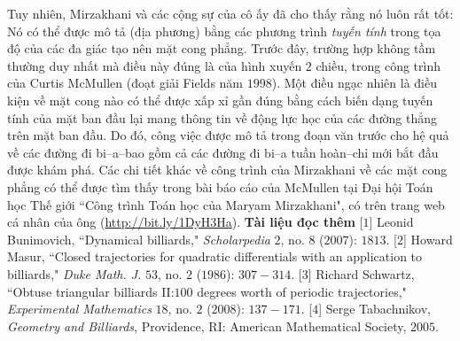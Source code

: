 \begin{multicols}{2}
	\vskip 0.1cm
	Tuy nhiên, Mirzakhani và các cộng sự của cô ấy đã cho thấy rằng nó luôn rất tốt: Nó có thể được mô tả (địa phương) bằng các phương trình \emph{tuyến tính} trong tọa độ của
	các đa giác tạo nên mặt cong phẳng. Trước đây, trường hợp không tầm thường duy nhất mà điều này đúng là của hình xuyến $2$ chiều, trong công trình của Curtis McMullen (đoạt giải Fields năm $1998$).
	\vskip 0.1cm
	Một điều ngạc nhiên là điều kiện về mặt cong nào có thể được xấp xỉ gần đúng bằng cách biến dạng tuyến tính của mặt ban đầu lại mang thông tin về động lực học của các đường thẳng trên mặt ban đầu. Do đó, công việc được mô tả trong đoạn văn trước cho hệ quả về các đường đi bi--a--bao gồm cả các đường đi bi--a tuần hoàn--chỉ mới bắt đầu được khám phá.
	\vskip 0.1cm
	Các chi tiết khác về công trình của Mirzakhani về các mặt cong phẳng có thể được tìm thấy trong bài báo cáo của McMullen tại Đại hội Toán học Thế giới ``Công trình Toán học của Maryam Mirzakhani", có trên trang web cá nhân của ông (\url{http://bit.ly/1DyH3Ha}).
	\vskip 0.1cm
	{\bf\color{duongvaotoanhoc}Tài liệu đọc thêm}
	\vskip 0.1cm
	[$1$] Leonid Bunimovich, ``Dynamical billiards," {\it Scholarpedia} $2$, no. $8$ ($2007$): $1813$.
	\vskip 0.1cm
	[$2$] Howard Masur, ``Closed trajectories for quadratic differentials with an application to billiards," {\it Duke Math. J.} $53$, no. $2$ ($1986$): $307-314$.
	\vskip 0.1cm
	[$3$] Richard Schwartz, ``Obtuse triangular billiards II:$100$ degrees worth of periodic trajectories," {\it Experimental Mathematics} $18$, no. $2$ ($2008$): $137-171$.
	\vskip 0.1cm
	[$4$] Serge Tabachnikov, {\it Geometry and Billiards}, Providence, RI: American Mathematical Society, $2005$.
\end{multicols}
